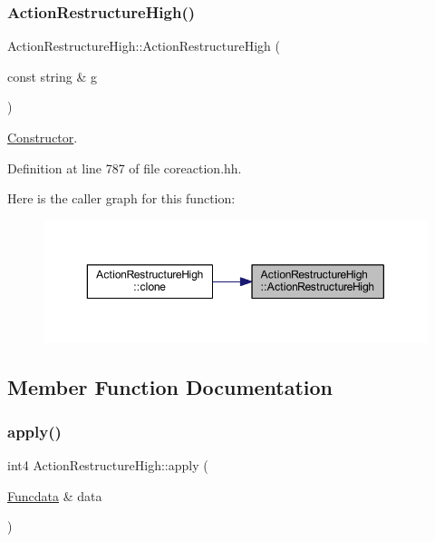 \subsubsection{\texorpdfstring{ActionRestructureHigh()}{ActionRestructureHigh()}}
{\footnotesize\ttfamily Action\+Restructure\+High\+::\+Action\+Restructure\+High (\begin{DoxyParamCaption}\item[{const string \&}]{g }\end{DoxyParamCaption})\hspace{0.3cm}{\ttfamily [inline]}}



\mbox{\hyperlink{class_constructor}{Constructor}}. 



Definition at line 787 of file coreaction.\+hh.

Here is the caller graph for this function\+:
\nopagebreak
\begin{figure}[H]
\begin{center}
\leavevmode
\includegraphics[width=350pt]{class_action_restructure_high_a8ca9db4ae43343f88fe2e1027b94f4d1_icgraph}
\end{center}
\end{figure}


\subsection{Member Function Documentation}
\mbox{\label{class_action_restructure_high_aeeacf5bf4d99c638c486a23b69f19207}} 
\subsubsection{\texorpdfstring{apply()}{apply()}}
{\footnotesize\ttfamily int4 Action\+Restructure\+High\+::apply (\begin{DoxyParamCaption}\item[{\mbox{\hyperlink{class_funcdata}{Funcdata}} \&}]{data }\end{DoxyParamCaption})\hspace{0.3cm}{\ttfamily [virtual]}}



